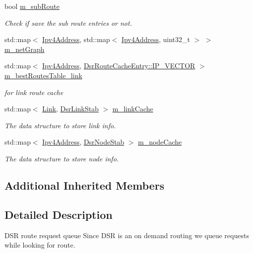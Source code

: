 \begin{DoxyCompactItemize}
bool \hyperlink{classns3_1_1dsr_1_1DsrRouteCache_aea55a575fdabc0a2cdf7cde483549d1f}{m\+\_\+sub\+Route}
\begin{DoxyCompactList}\small\item\em Check if save the sub route entries or not. \end{DoxyCompactList}\item 
std\+::map$<$ \hyperlink{classns3_1_1Ipv4Address}{Ipv4\+Address}, std\+::map$<$ \hyperlink{classns3_1_1Ipv4Address}{Ipv4\+Address}, uint32\+\_\+t $>$ $>$ \hyperlink{classns3_1_1dsr_1_1DsrRouteCache_a001b3261dc9f91bf3713b73c32206ee6}{m\+\_\+net\+Graph}
\item 
std\+::map$<$ \hyperlink{classns3_1_1Ipv4Address}{Ipv4\+Address}, \hyperlink{classns3_1_1dsr_1_1DsrRouteCacheEntry_ab834177006bdbfd2e3fa607c2a88cbdf}{Dsr\+Route\+Cache\+Entry\+::\+I\+P\+\_\+\+V\+E\+C\+T\+OR} $>$ \hyperlink{classns3_1_1dsr_1_1DsrRouteCache_aeff05d869cb32e13605d4792a0a0d841}{m\+\_\+best\+Routes\+Table\+\_\+link}
\begin{DoxyCompactList}\small\item\em for link route cache \end{DoxyCompactList}\item 
std\+::map$<$ \hyperlink{structns3_1_1dsr_1_1Link}{Link}, \hyperlink{classns3_1_1dsr_1_1DsrLinkStab}{Dsr\+Link\+Stab} $>$ \hyperlink{classns3_1_1dsr_1_1DsrRouteCache_a0cce90def8da7bd0953a59cf1cfd2a66}{m\+\_\+link\+Cache}
\begin{DoxyCompactList}\small\item\em The data structure to store link info. \end{DoxyCompactList}\item 
std\+::map$<$ \hyperlink{classns3_1_1Ipv4Address}{Ipv4\+Address}, \hyperlink{classns3_1_1dsr_1_1DsrNodeStab}{Dsr\+Node\+Stab} $>$ \hyperlink{classns3_1_1dsr_1_1DsrRouteCache_a2ad918da9614405b305be6c18ed04502}{m\+\_\+node\+Cache}
\begin{DoxyCompactList}\small\item\em The data structure to store node info. \end{DoxyCompactList}\end{DoxyCompactItemize}
\subsection*{Additional Inherited Members}


\subsection{Detailed Description}
D\+SR route request queue Since D\+SR is an on demand routing we queue requests while looking for route. 

